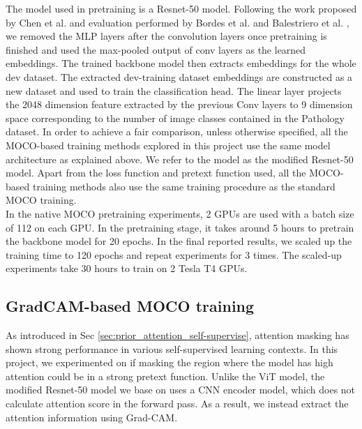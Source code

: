 \documentclass[12pt,twoside]{report}
\begin{document}
The model used in pretraining is a Resnet-50 model. Following the work proposed by Chen et al. \cite{mocov2} and evaluation performed by Bordes et al. \cite{guillotine} and Balestriero et al. \cite{cookbook}, we removed the MLP layers after the convolution layers once pretraining is finished and used the max-pooled output of conv layers as the learned embeddings. The trained backbone model then extracts embeddings for the whole dev dataset. The extracted dev-training dataset embeddings are constructed as a new dataset and used to train the classification head. The linear layer projects the 2048 dimension feature extracted by the previous Conv layers to 9 dimension space corresponding to the number of image classes contained in the Pathology dataset. In order to achieve a fair comparison, unless otherwise specified, all the MOCO-based training methods explored in this project use the same model architecture as explained above. We refer to the model as the modified Resnet-50 model. Apart from the loss function and pretext function used, all the MOCO-based training methods also use the same training procedure as the standard MOCO training.\\

In the native MOCO pretraining experiments, 2 GPUs are used with a batch size of 112 on each GPU. In the pretraining stage, it takes around 5 hours to pretrain the backbone model for 20 epochs. In the final reported results, we scaled up the training time to 120 epochs and repeat experiments for 3 times. The scaled-up experiments take 30 hours to train on 2 Tesla T4 GPUs. 


\subsection{GradCAM-based MOCO training} \label{sec:gradcamMOCO}
As introduced in Sec \ref{sec:prior_attention_self-supervise}, attention masking has shown strong performance in various self-supervised learning contexts. In this project, we experimented on if masking the region where the model has high attention could be in a strong pretext function. Unlike the ViT model, the modified Resnet-50 model we base on uses a CNN encoder model, which does not calculate attention score in the forward pass. As a result, we instead extract the attention information using Grad-CAM. \\
\end{document}
